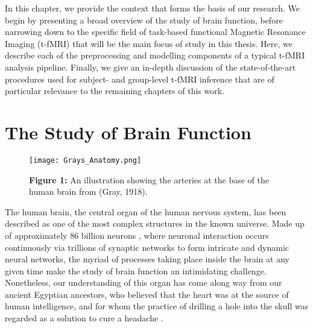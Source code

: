 In this chapter, we provide the context that forms the basis of our research. We begin by presenting a broad overview of the study of brain function, before narrowing down to the specific field of task-based functional Magnetic Resonance Imaging (t-fMRI) that will be the main focus of study in this thesis. Here, we describe each of the preprocessing and modelling components of a typical t-fMRI analysis pipeline. Finally, we give an in-depth discussion of the state-of-the-art procedures used for subject- and group-level t-fMRI inference that are of particular relevance to the remaining chapters of this work. 

\pagebreak

\section{The Study of Brain Function}

\begin{figure}[htbp]
\centering
	\texttt{[image: Grays\_Anatomy.png]}	
\caption*{\textbf{Figure 1:} An illustration showing the arteries at the base of the human brain from (Gray, 1918).}
\end{figure}

The human brain, the central organ of the human nervous system, has been described as one of the most complex structures in the known universe. Made up of approximately 86 billion neurons \citep{Azevedo2009-qj}, where neuronal interaction occurs continuously via trillions of synaptic networks to form intricate and dynamic neural networks, the myriad of processes taking place inside the brain at any given time make the study of brain function an intimidating challenge. Nonetheless, our understanding of this organ has come along way from our ancient Egyptian ancestors, who believed that the heart was at the source of human intelligence, and for whom the practice of drilling a hole into the skull was regarded as a solution to cure a headache \citep{Adelman1987-hs, Mohamed2014-gl}. 

